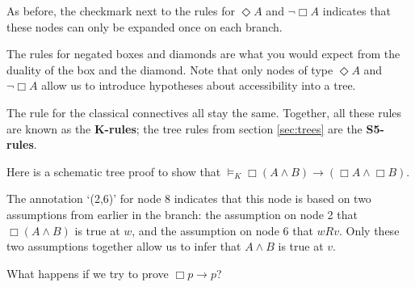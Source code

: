 As before, the checkmark next to the rules for $\Diamond A$ and $\neg \Box A$
indicates that these nodes can only be expanded once on each branch.

The rules for negated boxes and diamonds are what you would expect from
the duality of the box and the diamond. Note that only nodes of type
$\Diamond A$ and $\neg \Box A$ allow us to introduce hypotheses about
accessibility into a tree.

The rule for the classical connectives all stay the same. Together,
all these rules are known as the \textbf{K-rules}; the tree rules from
section \ref{sec:trees} are the \textbf{S5-rules}.

Here is a schematic tree proof to show that
$\models_K \Box (A \land B) \to (\Box A \land \Box B)$.

\begin{center}
\end{center}
%
The annotation `(2,6)' for node 8 indicates that this node is based on two
assumptions from earlier in the branch: the assumption on node 2 that
$\Box (A \land B)$ is true at $w$, and the assumption on node 6 that $wRv$. Only
these two assumptions together allow us to infer that $A \land B$ is true at
$v$.

What happens if we try to prove $\Box p \to p$?

